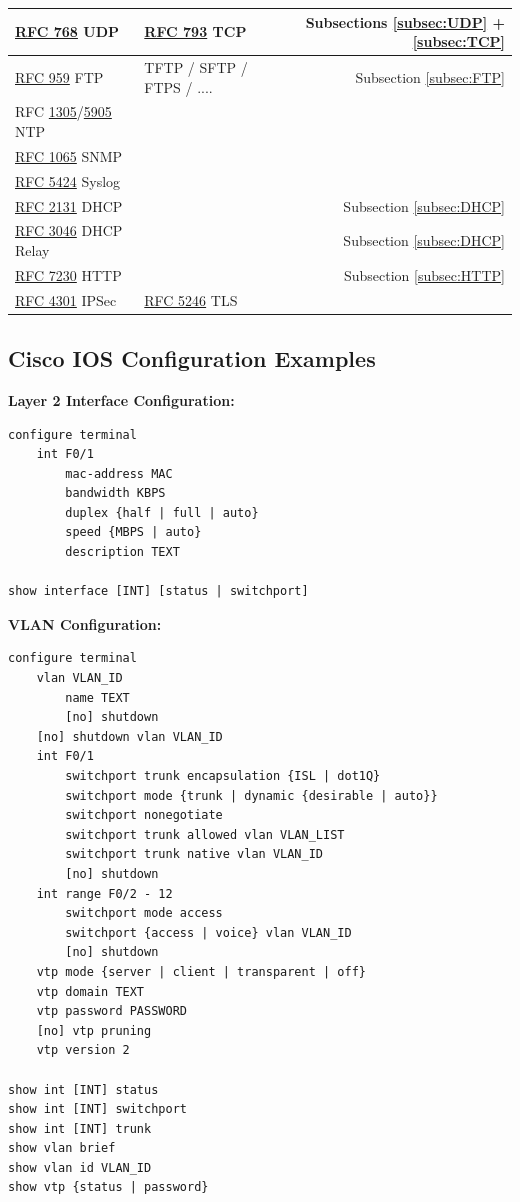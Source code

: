 \documentclass[12pt]{article}
\newcommand{\rfc}[1]{\href{https://datatracker.ietf.org/doc/html/rfc#1}{#1}}
\newcommand{\RFC}[1]{\href{https://datatracker.ietf.org/doc/html/rfc#1}{RFC #1}}
\begin{document}
\begin{table}[H]
\begin{tabular}{llr}
	\RFC{768} UDP			& \RFC{793} TCP			& Subsections \ref{subsec:UDP} + \ref{subsec:TCP}\\\hline
	\RFC{959} FTP			& TFTP / SFTP / FTPS / ....	& Subsection \ref{subsec:FTP}\\
	RFC \rfc{1305}/\rfc{5905} NTP	&					&\\
	\RFC{1065} SNMP			&					&\\
	\RFC{5424} Syslog			&					&\\
	\RFC{2131} DHCP			&					& Subsection \ref{subsec:DHCP}\\
	\RFC{3046} DHCP Relay		&					& Subsection \ref{subsec:DHCP}\\
	\RFC{7230} HTTP			&					& Subsection \ref{subsec:HTTP}\\
	\RFC{4301} IPSec			& \RFC{5246} TLS			&\\\hline
	\end{tabular}\end{table}


	\newpage
	\subsection{Cisco IOS Configuration Examples \label{subsec:CONFIG}}
	\textbf{Layer 2 Interface Configuration:}
	\begin{lstlisting}
configure terminal
	int F0/1
		mac-address MAC
		bandwidth KBPS
		duplex {half | full | auto}
		speed {MBPS | auto}
		description TEXT
		
show interface [INT] [status | switchport]
	\end{lstlisting}

	\textbf{VLAN Configuration:}
	\begin{lstlisting}
configure terminal
	vlan VLAN_ID
		name TEXT
		[no] shutdown
	[no] shutdown vlan VLAN_ID
	int F0/1
		switchport trunk encapsulation {ISL | dot1Q}
		switchport mode {trunk | dynamic {desirable | auto}}
		switchport nonegotiate
		switchport trunk allowed vlan VLAN_LIST
		switchport trunk native vlan VLAN_ID
		[no] shutdown
	int range F0/2 - 12
		switchport mode access
		switchport {access | voice} vlan VLAN_ID
		[no] shutdown
	vtp mode {server | client | transparent | off}
	vtp domain TEXT
	vtp password PASSWORD
	[no] vtp pruning
	vtp version 2

show int [INT] status
show int [INT] switchport
show int [INT] trunk
show vlan brief
show vlan id VLAN_ID
show vtp {status | password}
	\end{lstlisting}
\end{document}
